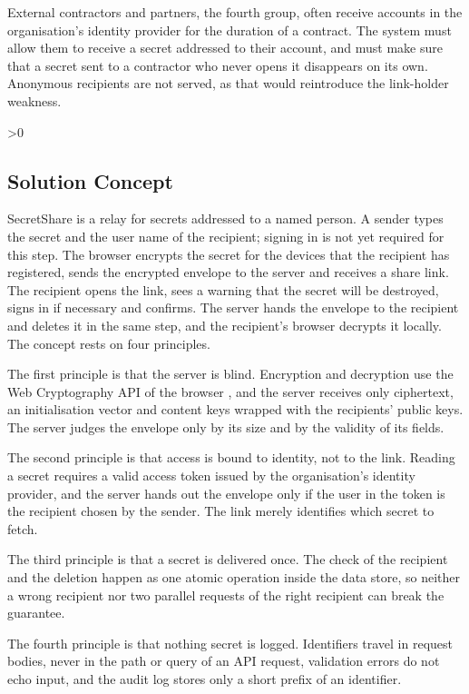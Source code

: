 \documentclass[12pt,a4paper]{article}
\numberwithin{equation}{section}
\numberwithin{figure}{section}
\numberwithin{table}{section}
\newcommand{\subsec}[1]{%
  \ifnum\value{subsection}>0\clearpage\fi
  \subsection{#1}%
}
\begin{document}
External contractors and partners, the fourth group, often receive accounts in the organisation's identity provider for the duration of a contract. The system must allow them to receive a secret addressed to their account, and must make sure that a secret sent to a contractor who never opens it disappears on its own. Anonymous recipients are not served, as that would reintroduce the link-holder weakness.


\subsec{Solution Concept}

SecretShare is a relay for secrets addressed to a named person. A sender types the secret and the user name of the recipient; signing in is not yet required for this step. The browser encrypts the secret for the devices that the recipient has registered, sends the encrypted envelope to the server and receives a share link. The recipient opens the link, sees a warning that the secret will be destroyed, signs in if necessary and confirms. The server hands the envelope to the recipient and deletes it in the same step, and the recipient's browser decrypts it locally. The concept rests on four principles.

The first principle is that the server is blind. Encryption and decryption use the Web Cryptography API of the browser \cite{webcrypto}, and the server receives only ciphertext, an initialisation vector and content keys wrapped with the recipients' public keys. The server judges the envelope only by its size and by the validity of its fields.

The second principle is that access is bound to identity, not to the link. Reading a secret requires a valid access token issued by the organisation's identity provider, and the server hands out the envelope only if the user in the token is the recipient chosen by the sender. The link merely identifies which secret to fetch.

The third principle is that a secret is delivered once. The check of the recipient and the deletion happen as one atomic operation inside the data store, so neither a wrong recipient nor two parallel requests of the right recipient can break the guarantee.

The fourth principle is that nothing secret is logged. Identifiers travel in request bodies, never in the path or query of an API request, validation errors do not echo input, and the audit log stores only a short prefix of an identifier.
\end{document}
